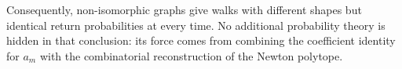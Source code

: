 Consequently, non-isomorphic graphs give
walks with different shapes but identical
return probabilities at every time. No
additional probability theory is hidden in
that conclusion: its force comes from
combining the coefficient identity for
$a_m$ with the combinatorial reconstruction
of the Newton polytope.





